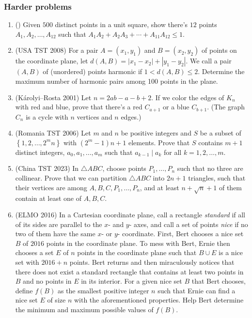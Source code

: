 \documentclass[11pt,paper=letter]{scrartcl}
\begin{document}
\subsubsection*{Harder problems}

\begin{enumerate}[resume]
\item (\href{https://drive.google.com/file/d/1zFLUE59CACJtZKi9FVByllG40dhff1VQ/view}{\!}) Given $500$ distinct points in a unit square, show there's $12$ points $A_1, A_2,\ldots,A_{12}$ such that $A_1A_2 + A_2A_3 + \cdots + A_{11}A_{12} \le 1$. \hint{\ref{h:5}}

\item (USA TST 2008) For a pair $ A = (x_1, y_1)$ and $ B = (x_2, y_2)$ of points on the coordinate plane, let $ d(A,B) = |x_1 - x_2| + |y_1 - y_2|$. We call a pair $ (A,B)$ of (unordered) points harmonic if $ 1 < d(A,B) \leq 2$. Determine the maximum number of harmonic pairs among 100 points in the plane. \hints{\ref{h:6} \ref{h:7}}

\item (K\'arolyi--Rosta 2001) Let $n = 2ab - a - b + 2$. If we color the edges of $K_n$ with red and blue, prove that there's a red $C_{a + 1}$ or a blue $C_{b + 1}$. (The graph $C_n$ is a cycle with $n$ vertices and $n$ edges.) \hint{\ref{h:8}}

\item (Romania TST 2006) Let $m$ and $n$ be positive integers and $S$ be a subset of $ \left\{ 1, 2, \ldots, 2^mn \right\} $ with $ (2^m - 1)n + 1 $ elements. Prove that $S$ contains $m + 1$ distinct integers, $a_0, a_1, \ldots, a_m$ such that $a_{k - 1} \mid a_k$ for all $k = 1, 2, \ldots, m$. \hint{\ref{h:9}}

\item (China TST 2023) In $\triangle ABC$, choose points $P_1, \ldots, P_n$ such that no three are collinear. Prove that we can partition $\triangle ABC$ into $2n + 1$ triangles, such that their vertices are among $A, B, C, P_1, \ldots, P_n$, and at least $n + \sqrt{n} + 1$ of them contain at least one of $A, B, C$. \hint{\ref{h:10}}

\item (ELMO 2016) In a Cartesian coordinate plane, call a rectangle \textit{standard} if all of its sides are parallel to the $x$- and $y$- axes, and call a set of points \textit{nice} if no two of them have the same $x$- or $y$- coordinate. First, Bert chooses a nice set $B$ of $2016$ points in the coordinate plane. To mess with Bert, Ernie then chooses a set $E$ of $n$ points in the coordinate plane such that $B\cup E$ is a nice set with $2016+n$ points. Bert returns and then miraculously notices that there does not exist a standard rectangle that contains at least two points in $B$ and no points in $E$ in its interior. For a given nice set $B$ that Bert chooses, define $f(B)$ as the smallest positive integer $n$ such that Ernie can find a nice set $E$ of size $n$ with the aforementioned properties. Help Bert determine the minimum and maximum possible values of $f(B)$. \hint{\ref{h:11}}
\end{enumerate}
\end{document}
